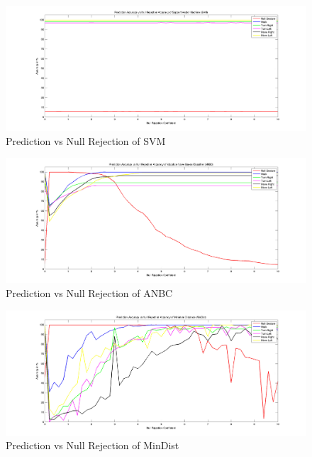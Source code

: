 \begin{figure}
	\hspace{-35 mm}
	\includegraphics[width=225mm]{figures/result/test-accuracy-svm.jpg}
	\caption{Prediction vs Null Rejection of SVM}
	\label{ev:accuracy:svm}
\end{figure}
\begin{figure}
	\hspace{-35 mm}
	\includegraphics[width=225mm]{figures/result/test-accuracy-anbc.jpg}
	\caption{Prediction vs Null Rejection of ANBC}
	\label{ev:accuracy:anbc}
\end{figure}
\begin{figure} 	
	\hspace{-35 mm}
	\includegraphics[width=225mm]{figures/result/test-accuracy-mindist.jpg}
	\caption{Prediction vs Null Rejection of MinDist}
	\label{ev:accuracy:mindist}
\end{figure}